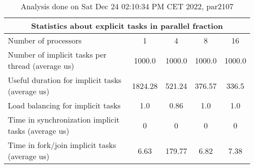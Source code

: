 \begin{table}[h]
\begin{center}
\begin{tabular}{|l|c|c|c|c|}
\hline
\multicolumn{5}{|c|}{Statistics about explicit tasks in parallel fraction} \\
\hline
\hline
Number of processors & 1 & 4 & 8 & 16 \\
\hline
\hline
Number of implicit tasks per thread (average us)    &          1000.0 &          1000.0 &          1000.0 &          1000.0 \\
\hline
Useful duration for implicit tasks (average us)     &         1824.28 &          521.24 &          376.57 &           336.5 \\
\hline
Load balancing for implicit tasks                &             1.0 &            0.86 &             1.0 &             1.0 \\
\hline
Time in synchronization implicit tasks (average us) &               0 &               0 &               0 &               0 \\
\hline
Time in fork/join implicit tasks (average us)       &            6.63 &          179.77 &            6.82 &            7.38 \\
\hline
\end{tabular}
\end{center}
\caption{ Analysis done on Sat Dec 24 02:10:34 PM CET 2022, par2107}
\end{table}
